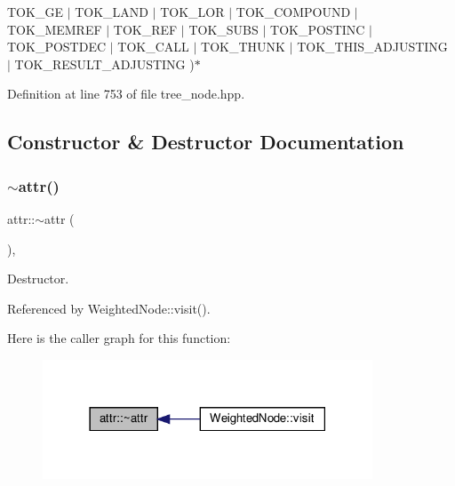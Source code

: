 T\+O\+K\+\_\+\+GE $\vert$ T\+O\+K\+\_\+\+L\+A\+ND $\vert$ T\+O\+K\+\_\+\+L\+OR $\vert$ T\+O\+K\+\_\+\+C\+O\+M\+P\+O\+U\+ND $\vert$ T\+O\+K\+\_\+\+M\+E\+M\+R\+EF $\vert$ T\+O\+K\+\_\+\+R\+EF $\vert$ T\+O\+K\+\_\+\+S\+U\+BS $\vert$ T\+O\+K\+\_\+\+P\+O\+S\+T\+I\+NC $\vert$ T\+O\+K\+\_\+\+P\+O\+S\+T\+D\+EC $\vert$ T\+O\+K\+\_\+\+C\+A\+LL $\vert$ T\+O\+K\+\_\+\+T\+H\+U\+NK $\vert$ T\+O\+K\+\_\+\+T\+H\+I\+S\+\_\+\+A\+D\+J\+U\+S\+T\+I\+NG $\vert$ T\+O\+K\+\_\+\+R\+E\+S\+U\+L\+T\+\_\+\+A\+D\+J\+U\+S\+T\+I\+NG )$\ast$ 

Definition at line 753 of file tree\+\_\+node.\+hpp.



\subsection{Constructor \& Destructor Documentation}
\mbox{\label{structattr_ae4bfc0ef34097f42a635d59de25ba97a}} 
\subsubsection{\texorpdfstring{$\sim$attr()}{~attr()}}
{\footnotesize\ttfamily attr\+::$\sim$attr (\begin{DoxyParamCaption}{ }\end{DoxyParamCaption})\hspace{0.3cm}{\ttfamily [virtual]}, {\ttfamily [default]}}



Destructor. 



Referenced by Weighted\+Node\+::visit().

Here is the caller graph for this function\+:
\nopagebreak
\begin{figure}[H]
\begin{center}
\leavevmode
\includegraphics[width=278pt]{dc/de4/structattr_ae4bfc0ef34097f42a635d59de25ba97a_icgraph}
\end{center}
\end{figure}


